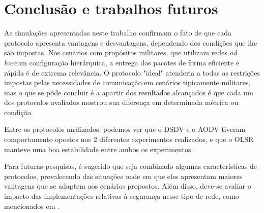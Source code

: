 \section{Conclus\~ao e trabalhos futuros}

As simula\c{c}\~oes apresentadas neste trabalho confirmam o fato de que cada protocolo apresenta vantagens e desvantagens, dependendo dos condi\c{c}\~oes que lhe s\~ao impostas. 
Nos cen\'arios com prop\'ositos militares, que utilizam redes \textit{ad hoc}com configura\c{c}\~ao hier\'arquica, a entrega dos pacotes de forma eficiente e r\'apida \'e de extrema relev\^ancia. 
O protocolo "ideal" atenderia a todas as restri\c{c}\~oes impostas pelas necessidades de comunica\c{c}\~ao em cen\'arios tipicamente militares, mas o que se p\^ode concluir \'e a apartir dos resultados alcan\c{c}ados \'e que cada um dos protocolos avaliados mostrou sua diferen\c{c}a em determinada m\'etrica ou condi\c{c}\~ao.

Entre os protocolos analizados, podemos ver que o DSDV e o AODV tiveram comportamento opostos nos 2 diferentes experimentos realizados, e que o OLSR manteve uma boa estabilidade entre ambos os experimentos.

Para futuras pesquisas, \'e sugerido que seja combinado algumas caracter\'isticas de protocolos, prevalecendo das situa\c{c}\~oes onde em que eles apresentam maiores vantagens que se adaptem aos cen\'arios propostos. Al\'em disso, deve-se avaliar o impacto das implementa\c{c}\~oes relativas \`a seguran\c{c}a nesse tipo de rede, como mencionados em \cite{salles}.


